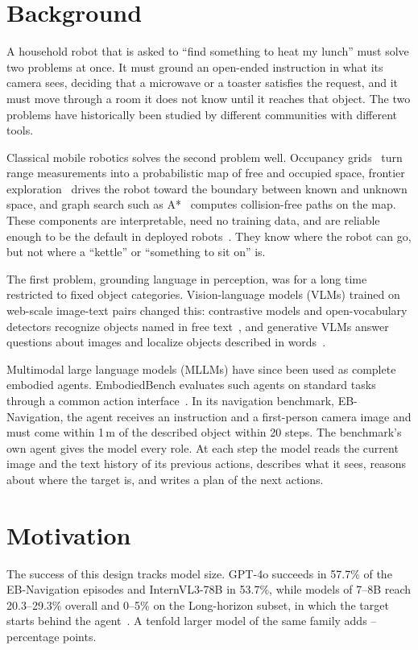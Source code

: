 \label{chap:intro}

\section{Background}
\label{sec:intro-background}
A household robot that is asked to ``find something to heat my lunch'' must solve two problems at once. It must
ground an open-ended instruction in what its camera sees, deciding that a microwave or a toaster satisfies the
request, and it must move through a room it does not know until it reaches that object. The two problems have
historically been studied by different communities with different tools.

Classical mobile robotics solves the second problem well. Occupancy grids~\cite{elfes1989occupancy} turn range
measurements into a probabilistic map of free and occupied space, frontier exploration~\cite{yamauchi1997frontier}
drives the robot toward the boundary between known and unknown space, and graph search such as A*~\cite{hart1968astar}
computes collision-free paths on the map. These components are interpretable, need no training data, and are
reliable enough to be the default in deployed robots~\cite{thrun2005probabilistic}. They know where the robot can
go, but not where a ``kettle'' or ``something to sit on'' is.

The first problem, grounding language in perception, was for a long time restricted to fixed object categories.
Vision-language models (VLMs) trained on web-scale image-text pairs changed this: contrastive models and
open-vocabulary detectors recognize objects named in free text~\cite{radford2021clip,minderer2022owlvit,liu2024groundingdino},
and generative VLMs answer questions about images and localize objects described in words~\cite{bai2025qwen25vl,bai2025qwen3vl}.

Multimodal large language models (MLLMs) have since been used as complete embodied agents. EmbodiedBench evaluates
such agents on standard tasks through a common action interface~\cite{yang2025embodiedbench}. In its navigation
benchmark, EB-Navigation, the agent receives an instruction and a first-person camera image and must come within
1\,m of the described object within 20 steps. The benchmark's own agent gives the model every role. At each step
the model reads the current image and the text history of its previous actions, describes what it sees, reasons
about where the target is, and writes a plan of the next actions.

\section{Motivation}
\label{sec:intro-motivation}
The success of this design tracks model size. GPT-4o succeeds in 57.7\% of the EB-Navigation episodes and
InternVL3-78B in 53.7\%, while models of 7--8B reach 20.3--29.3\% overall and 0--5\% on the Long-horizon subset, in
which the target starts behind the agent~\cite{yang2025embodiedbench}. A tenfold larger model of the same family adds
\nScaleQwen--\nScaleIntern{} percentage points.

